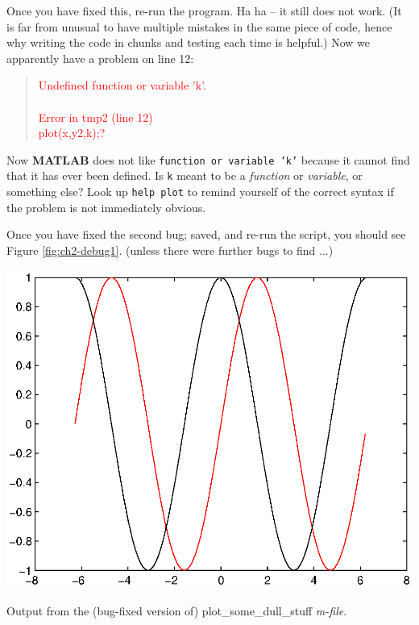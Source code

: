 \documentclass{tufte-book} %
\newenvironment{docspec}{\begin{quotation}\ttfamily\parskip0pt\parindent0pt\ignorespaces}{\end{quotation}}
\begin{document}
Once you have fixed this, re-run the program. Ha ha -- it still does not work. (It is far from unusual to have multiple mistakes in the same piece of code, hence why writing the code in chunks and testing each time is helpful.)
\noindent Now we apparently have a problem on line 12:

\begin{docspec}
\textcolor{red}{Undefined function or variable 'k'.
\\ \
\\ Error in tmp2 (line 12)
\\ plot(x,y2,k);?}
\end{docspec}

\noindent Now \textbf{MATLAB} does not like \texttt{function or variable 'k'} because it cannot find that it has ever been defined. Is \texttt{k} meant to be a \textit{function} or \textit{variable}, or something else? Look up \texttt{help plot} to remind yourself of the correct syntax if the problem is not immediately obvious.

Once you have fixed the second bug; saved, and re-run the script, you should see Figure \ref{fig:ch2-debug1}. (unless there were further bugs to find ...)

\begin{marginfigure}[0.0in]
\includegraphics[width=\linewidth]{ch2-debug1.eps}
\caption{Output from the (bug-fixed version of) \textsf{plot\_some\_dull\_stuff} \textit{m-file}.}
\label{fig:ch2-debug1}
\end{marginfigure}

\end{document}
